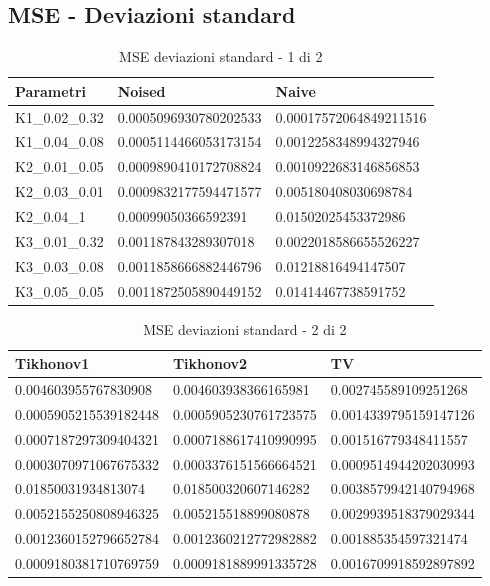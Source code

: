 \documentclass[12pt]{article}
\begin{document}
    \newpage
    \subsection{MSE - Deviazioni standard}
    \begin{table}[!ht]
    \centering
    \begin{tabular}{|l|l|l|}
    \hline
        Parametri & Noised & Naive \\ \hline
        K1\_0.02\_0.32 & 0.0005096930780202533 & 0.00017572064849211516 \\ \hline
        K1\_0.04\_0.08 & 0.0005114466053173154 & 0.0012258348994327946 \\ \hline
        K2\_0.01\_0.05 & 0.0009890410172708824 & 0.0010922683146856853 \\ \hline
        K2\_0.03\_0.01 & 0.0009832177594471577 & 0.005180408030698784 \\ \hline
        K2\_0.04\_1 & 0.00099050366592391 & 0.01502025453372986 \\ \hline
        K3\_0.01\_0.32 & 0.001187843289307018 & 0.0022018586655526227 \\ \hline
        K3\_0.03\_0.08 & 0.0011858666882446796 & 0.01218816494147507 \\ \hline
        K3\_0.05\_0.05 & 0.0011872505890449152 & 0.01414467738591752 \\ \hline
    \end{tabular}
    \caption{MSE deviazioni standard - 1 di 2}
    \label{table:12}
    \end{table}

    \begin{table}[!ht]
    \centering
    \begin{tabular}{|l|l|l|}
    \hline
        Tikhonov1 & Tikhonov2 & TV \\ \hline
        0.004603955767830908 & 0.004603938366165981 & 0.002745589109251268 \\ \hline
        0.0005905215539182448 & 0.0005905230761723575 & 0.0014339795159147126 \\ \hline
        0.0007187297309404321 & 0.0007188617410990995 & 0.001516779348411557 \\ \hline
        0.0003070971067675332 & 0.0003376151566664521 & 0.0009514944202030993 \\ \hline
        0.01850031934813074 & 0.018500320607146282 & 0.0038579942140794968 \\ \hline
        0.0052155250808946325 & 0.005215518899080878 & 0.0029939518379029344 \\ \hline
        0.0012360152796652784 & 0.0012360212772982882 & 0.001885354597321474 \\ \hline
        0.0009180381710769759 & 0.0009181889991335728 & 0.0016709918592897892 \\ \hline
    \end{tabular}
    \caption{MSE deviazioni standard - 2 di 2}
    \label{table:13}
    \end{table}
\end{document}
